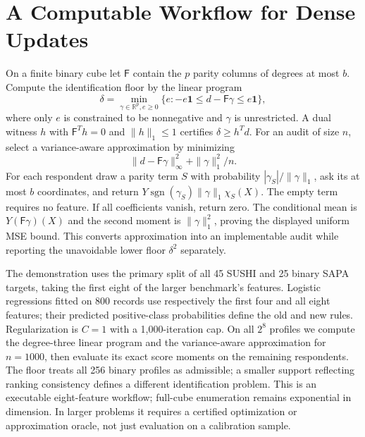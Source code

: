 \section{A Computable Workflow for Dense Updates}\label{app:dense}
On a finite binary cube let $\mathsf F$ contain the $p$ parity columns of degrees at most $b$. Compute the identification floor by the linear program
\[
 \delta=\min_{\gamma\in\mathbb R^p,e\ge0}\{e:-e\mathbf1\le d-\mathsf F\gamma\le e\mathbf1\},
\]
where only $e$ is constrained to be nonnegative and $\gamma$ is unrestricted. A dual witness $h$ with $\mathsf F^Th=0$ and $\|h\|_1\le1$ certifies $\delta\ge h^Td$. For an audit of size $n$, select a variance-aware approximation by minimizing
\[
 \|d-\mathsf F\gamma\|_\infty^2+\|\gamma\|_1^2/n.
\]
For each respondent draw a parity term $S$ with probability $|\gamma_S|/\|\gamma\|_1$, ask its at most $b$ coordinates, and return $Y\operatorname{sgn}(\gamma_S)\|\gamma\|_1\chi_S(X)$. The empty term requires no feature. If all coefficients vanish, return zero. The conditional mean is $Y(\mathsf F\gamma)(X)$ and the second moment is $\|\gamma\|_1^2$, proving the displayed uniform MSE bound. This converts approximation into an implementable audit while reporting the unavoidable lower floor $\delta^2$ separately.

The demonstration uses the primary split of all 45 SUSHI and 25 binary SAPA targets, taking the first eight of the larger benchmark's features. Logistic regressions fitted on 800 records use respectively the first four and all eight features; their predicted positive-class probabilities define the old and new rules. Regularization is $C=1$ with a 1,000-iteration cap. On all $2^8$ profiles we compute the degree-three linear program and the variance-aware approximation for $n=1000$, then evaluate its exact score moments on the remaining respondents. The floor treats all 256 binary profiles as admissible; a smaller support reflecting ranking consistency defines a different identification problem. This is an executable eight-feature workflow; full-cube enumeration remains exponential in dimension. In larger problems it requires a certified optimization or approximation oracle, not just evaluation on a calibration sample.

